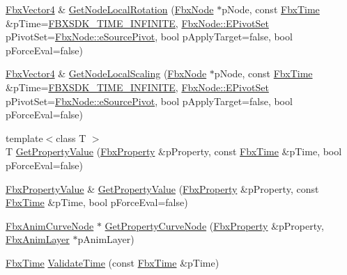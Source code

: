 \begin{DoxyCompactItemize}
\item 
\hyperlink{class_fbx_vector4}{Fbx\+Vector4} \& \hyperlink{class_fbx_anim_evaluator_a8ffff0649bfdf67d6508a72f8787d895}{Get\+Node\+Local\+Rotation} (\hyperlink{class_fbx_node}{Fbx\+Node} $\ast$p\+Node, const \hyperlink{class_fbx_time}{Fbx\+Time} \&p\+Time=\hyperlink{fbxtime_8h_a1e6db3fe0f84f0b7daa775739f93526f}{F\+B\+X\+S\+D\+K\+\_\+\+T\+I\+M\+E\+\_\+\+I\+N\+F\+I\+N\+I\+TE}, \hyperlink{class_fbx_node_ae62b7311ac4727654cdf1ebd5cbf7343}{Fbx\+Node\+::\+E\+Pivot\+Set} p\+Pivot\+Set=\hyperlink{class_fbx_node_ae62b7311ac4727654cdf1ebd5cbf7343ae8ed37a5c7e41f8d1cec9d3fa8424b69}{Fbx\+Node\+::e\+Source\+Pivot}, bool p\+Apply\+Target=false, bool p\+Force\+Eval=false)
\item 
\hyperlink{class_fbx_vector4}{Fbx\+Vector4} \& \hyperlink{class_fbx_anim_evaluator_aba31ec4baa8452ad2fcfdc82c85cc127}{Get\+Node\+Local\+Scaling} (\hyperlink{class_fbx_node}{Fbx\+Node} $\ast$p\+Node, const \hyperlink{class_fbx_time}{Fbx\+Time} \&p\+Time=\hyperlink{fbxtime_8h_a1e6db3fe0f84f0b7daa775739f93526f}{F\+B\+X\+S\+D\+K\+\_\+\+T\+I\+M\+E\+\_\+\+I\+N\+F\+I\+N\+I\+TE}, \hyperlink{class_fbx_node_ae62b7311ac4727654cdf1ebd5cbf7343}{Fbx\+Node\+::\+E\+Pivot\+Set} p\+Pivot\+Set=\hyperlink{class_fbx_node_ae62b7311ac4727654cdf1ebd5cbf7343ae8ed37a5c7e41f8d1cec9d3fa8424b69}{Fbx\+Node\+::e\+Source\+Pivot}, bool p\+Apply\+Target=false, bool p\+Force\+Eval=false)
\item 
{\footnotesize template$<$class T $>$ }\\T \hyperlink{class_fbx_anim_evaluator_a49b4a647d33b2ce26b27ba35ddb8a0ed}{Get\+Property\+Value} (\hyperlink{class_fbx_property}{Fbx\+Property} \&p\+Property, const \hyperlink{class_fbx_time}{Fbx\+Time} \&p\+Time, bool p\+Force\+Eval=false)
\item 
\hyperlink{class_fbx_property_value}{Fbx\+Property\+Value} \& \hyperlink{class_fbx_anim_evaluator_a98b68793cbb2d95f499ea2d433dd8c4d}{Get\+Property\+Value} (\hyperlink{class_fbx_property}{Fbx\+Property} \&p\+Property, const \hyperlink{class_fbx_time}{Fbx\+Time} \&p\+Time, bool p\+Force\+Eval=false)
\item 
\hyperlink{class_fbx_anim_curve_node}{Fbx\+Anim\+Curve\+Node} $\ast$ \hyperlink{class_fbx_anim_evaluator_a63f726da981ecfea4fc4f60145bb0f1d}{Get\+Property\+Curve\+Node} (\hyperlink{class_fbx_property}{Fbx\+Property} \&p\+Property, \hyperlink{class_fbx_anim_layer}{Fbx\+Anim\+Layer} $\ast$p\+Anim\+Layer)
\item 
\hyperlink{class_fbx_time}{Fbx\+Time} \hyperlink{class_fbx_anim_evaluator_af5226e1b2bc178417980b746c34888e4}{Validate\+Time} (const \hyperlink{class_fbx_time}{Fbx\+Time} \&p\+Time)

\end{DoxyCompactItemize}
